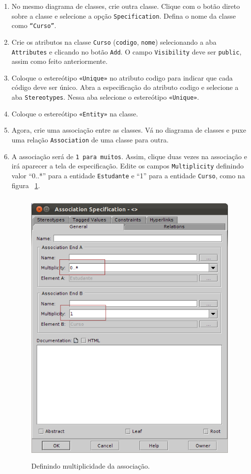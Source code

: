 \begin{enumerate}
\item No mesmo diagrama de classes, crie outra classe. Clique com o botão direto
sobre a classe e selecione a opção \texttt{Specification}. Defina o nome da classe como
\texttt{“Curso”}.
	
\item Crie os atributos na classe \texttt{Curso} (\texttt{codigo},
\texttt{nome}) selecionando a aba \texttt{Attributes} e clicando no botão
\texttt{Add}. O campo \texttt{Visibility} deve ser \texttt{public}, assim como
feito anteriormente.

\item Coloque o estereótipo \texttt{«Unique»} no atributo codigo para indicar
que cada código deve ser único. Abra a especificação do atributo codigo e
selecione a aba \texttt{Stereotypes}. Nessa aba selecione o estereótipo
\texttt{«Unique»}.
	
\item Coloque o estereótipo \texttt{«Entity»} na classe.
	
\item Agora, crie uma associação entre as classes. Vá no diagrama de classes e
puxe uma relação \texttt{Association} de uma classe para outra.
	
\item A associação será de \texttt{1 para muitos}. Assim, clique duas vezes na associação
e irá aparecer a tela de especificação. Edite os campos \texttt{Multiplicity} definindo
valor “0..*” para a entidade \texttt{Estudante} e “1” para a entidade
\texttt{Curso}, como na figura ~\ref{define_multiplicidade_associacao}.
\begin{figure}[H]
	\centering
	\includegraphics[width=350pt,height=400pt]{imgs/tutorial-mdarte-0005.png}
	\caption{Definindo multiplicidade da associação.}
	\label{define_multiplicidade_associacao}
\end{figure}
	

\end{enumerate}
